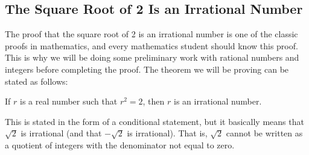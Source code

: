 \subsection*{The Square Root of 2 Is an Irrational Number}
The proof that the square root of  2 is an irrational number is one of the classic proofs in mathematics, and  every mathematics student should know this proof.  %
This is why we will be doing some preliminary work with rational numbers and integers before completing the proof.  The theorem we will be proving can be stated as follows:

\setcounter{equation}{0}
\begin{theorem}\label{T:squareroot2}
If  $r$  is a real number such that  $r^2  = 2$, then  $r$  is an irrational number.
\end{theorem}
This is stated in the form of a conditional statement, but it basically means that  $\sqrt 2$
 is irrational (and that   $ - \sqrt 2$ is irrational).  That is,  $\sqrt 2$  cannot be written as a quotient of integers with the denominator not equal to zero.

